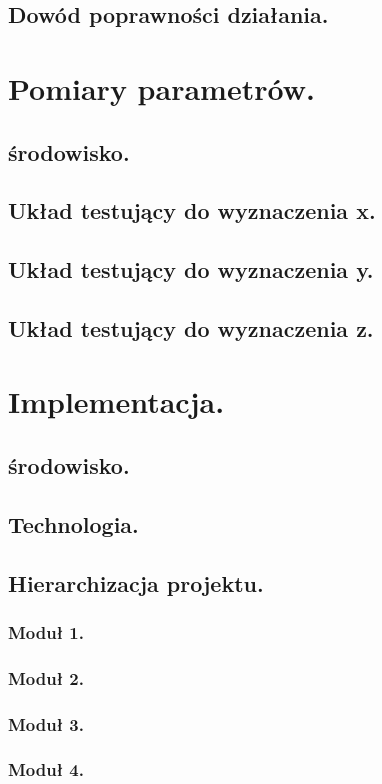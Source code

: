 \documentclass[10pt,a4paper]{report}
\begin{document}
	\section{Dowód poprawności działania.}

	\chapter{Pomiary parametrów.}
	\section{środowisko.}
	\section{Układ testujący do wyznaczenia x.}
	\section{Układ testujący do wyznaczenia y.}
	\section{Układ testujący do wyznaczenia z.}
	
	\chapter{Implementacja.}
	\section{środowisko.}
	\section{Technologia.}
	\section{Hierarchizacja projektu.}
	\subsection{Moduł 1.}
	\subsection{Moduł 2.}
	\subsection{Moduł 3.}
	\subsection{Moduł 4.}
	
\end{document}
